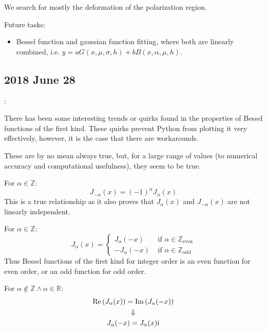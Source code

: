 \documentclass[twocolumn]{article}
\begin{document}
\begin{meetingnotes*}
	We search for mostly the deformation of the polarization region. 

	Future tasks:
	\begin{itemize}
		\item Bessel function and gaussian function fitting, where both are linearly combined, i.e. $y = a G(x,\mu,\sigma,h) + b B(x,\alpha,\mu,h)$.
	\end{itemize}
\end{meetingnotes*}


\subsection{2018 June 28}:
\label{subsec:2018_June_28}

There has been some interesting trends or quirks found in the properties of Bessel functions of the first kind. These quirks prevent Python from plotting it very effectively, however, it is the case that there are workarounds.

These are by no mean always true, but, for a large range of values (to numerical accuracy and computational usefulness), they seem to be true.

For $\alpha \in \mathbb{Z}$:
\begin{equation*}
	J_{-\alpha} (x) = \left( -1 \right)^{\alpha} J_{\alpha}(x)
\end{equation*}
This is a true relationship as it also proves that $J_{\alpha} (x)$ and $J_{-\alpha} (x)$ are not linearly independent.

For $\alpha \in \mathbb{Z}$:
\begin{equation*}
	J_\alpha (x) = 
	\begin{cases}
	J_\alpha (-x) & \text{ if } \alpha \in \mathbb{Z}_\text{even} \\ 
	-J_\alpha (-x) & \text{ if } \alpha \in \mathbb{Z}_\text{odd} 
	\end{cases}
\end{equation*}
Thus Bessel functions of the first kind for integer order is an even function for even order, or an odd function for odd order.

For $\alpha \notin \mathbb{Z} \land \alpha \in \mathbb{R}$:
\begin{gather*}
	\text{Re}\left( J_\alpha (x) \right) = \text{Im}\left( J_\alpha (-x) \right) \\
	\Downarrow \\
	J_\alpha (-x) = J_\alpha (x) \mathrm{i}\mkern1mu
\end{gather*}
\end{document}
